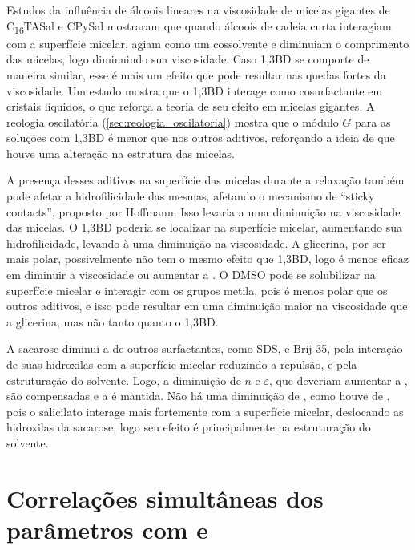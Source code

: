 		Estudos da influência de álcoois lineares na viscosidade de micelas gigantes de C\textsubscript{16}TASal e CPySal mostraram que quando álcoois de cadeia curta interagiam com a superfície micelar, agiam como um cossolvente e diminuiam o comprimento das micelas, logo diminuindo sua viscosidade. Caso 1,3BD se comporte de maneira similar, esse é mais um efeito que pode resultar nas quedas fortes da viscosidade. Um estudo mostra que o 1,3BD interage como cosurfactante em cristais líquidos, o que reforça a teoria de seu efeito em micelas gigantes. A reologia oscilatória (\autoref{sec:reologia_oscilatoria}) mostra que o módulo \(G\) para as soluções com 1,3BD é menor que nos outros aditivos, reforçando a ideia de que houve uma alteração na estrutura das micelas.
		
		A presença desses aditivos na superfície das micelas durante a relaxação também pode afetar a hidrofilicidade das mesmas, afetando o mecanismo de ``sticky contacts'', proposto por Hoffmann. Isso levaria a uma diminuição na viscosidade das micelas. O 1,3BD poderia se localizar na superfície micelar, aumentando sua hidrofilicidade, levando à uma diminuição na viscosidade. A glicerina, por ser mais polar, possivelmente não tem o mesmo efeito que 1,3BD, logo é menos eficaz em diminuir a viscosidade ou aumentar a \cmc. O DMSO pode se solubilizar na superfície micelar e interagir com os grupos metila, pois é menos polar que os outros aditivos, e isso pode resultar em uma diminuição maior na viscosidade que a glicerina, mas não tanto quanto o 1,3BD. 
		
		
		A sacarose diminui a \cmc{} de outros surfactantes, como SDS, \CTAB{} e Brij 35, pela interação de suas hidroxilas com a superfície micelar reduzindo a repulsão, e pela estruturação do solvente. Logo, a diminuição de \(n\) e \(\varepsilon\), que deveriam aumentar a \cwlm{}, são compensadas e a \cwlm{} é mantida. Não há uma diminuição de \cwlm, como houve de \cmc, pois o salicilato interage mais fortemente com a superfície micelar, deslocando as hidroxilas da sacarose, logo seu efeito é principalmente na estruturação do solvente.
		
		\section{Correlações simultâneas dos parâmetros com \cmc{} e \DHmic}
		
